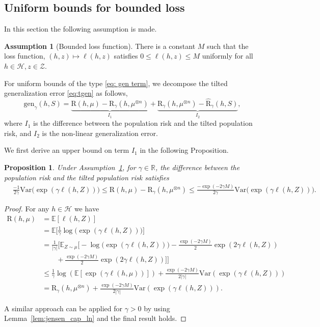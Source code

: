 \documentclass{article}
\theoremstyle{plain}
\theoremstyle{plain}
\newtheorem{proposition}[theorem]{Proposition}
\theoremstyle{definition}
\newtheorem{assumption}[theorem]{Assumption}
\theoremstyle{remark}
\newcommand{\var}{\mathrm{Var}}
\newcommand{\RTERM}{\widehat{\mathrm{R}}_{\gamma}}
\newcommand{\RTrue}{\mathrm{R}}
\newcommand{\RTET}{\mathrm{R}_{\gamma}}
\newcommand{\LA}{h}
\newcommand{\mbE}{\mathbb{E}}
\begin{document}
\subsection{Uniform bounds for bounded loss}\label{sec: uniform bound hofe}
In this section the following assumption is made.
\begin{assumption}[Bounded loss function]\label{Ass: bounded loss}
    There is a constant $M$ such that the loss function, $(h,z)\mapsto \ell(\LA,z)$ satisfies $0\leq\ell(h,z)\leq M$ uniformly for all $h \in \mathcal{H}, z \in \mathcal{Z}$.
\end{assumption}
For uniform bounds of the type \eqref{eq: gen term}, we decompose the tilted generalization error \eqref{eq:tgen} as follows,
\begin{equation}
  \mathrm{gen}_{\gamma}(h,S)=   \underbrace{\RTrue(h,\mu)- \RTET(h,\mu^{\otimes n})}_{I_1} + \underbrace{\RTET(h,\mu^{\otimes n})-\RTERM(h,S)}_{I_2},
\end{equation}
where $I_1$ is the difference between the population risk and the tilted population risk, and $I_2$ is the non-linear generalization error.

We first derive an upper bound on term $I_1$ in the following Proposition.
\begin{proposition}\label{Prop: True-TT}
    Under Assumption~\ref{Ass: bounded loss}, for $\gamma\in\mathbb{R}$, %
    the difference between the population risk and the tilted population risk satisfies
     \begin{equation}
        \begin{split}
          &\frac{-1}{2\gamma}\var\big(\exp(\gamma \ell (h,Z))\big)\leq  \RTrue(h,\mu)- \RTET(h,\mu^{\otimes n})\leq \frac{-\exp(-2\gamma M)}{2\gamma}\var\big(\exp(\gamma \ell (h,Z))\big).
        \end{split}
    \end{equation}
\end{proposition}
\begin{proof}
For any $h \in \mathcal{H}$ we have
\begin{equation}
        \begin{split}
        \RTrue(h,\mu)&=\mbE[\ell(h,Z)]\\
        &=\mbE\Big[\frac{1}{\gamma}\log\big(\exp(\gamma\ell(h,Z))\big)\Big]\\
        &=\frac{1}{|\gamma|}\Bigg[\mbE_{Z\sim\mu}\Big[-\log\big(\exp(\gamma \ell(h,Z)) \big)-\frac{\exp(-2\gamma M)}{2}\exp(2\gamma \ell(h,Z))
        \\&\qquad+\frac{\exp(-2\gamma M)}{2}\exp(2\gamma \ell(h,Z))\Big]\Bigg]\\
        &\leq \frac{1}{\gamma}\log(\mbE[\exp(\gamma\ell(h,\mu))])+\frac{\exp(-2\gamma M)}{2|\gamma|}\var(\exp(\gamma \ell (h,Z)))\\
        &=\RTET(h,\mu^{\otimes n})+\frac{\exp(-2\gamma M)}{2|\gamma|}\var(\exp(\gamma \ell (h,Z))).
        \end{split}
    \end{equation}

A similar approach can be applied for $\gamma>0$ by using Lemma~\ref{lem:jensen_cap_ln} and the final result holds.
\end{proof}
\end{document}
